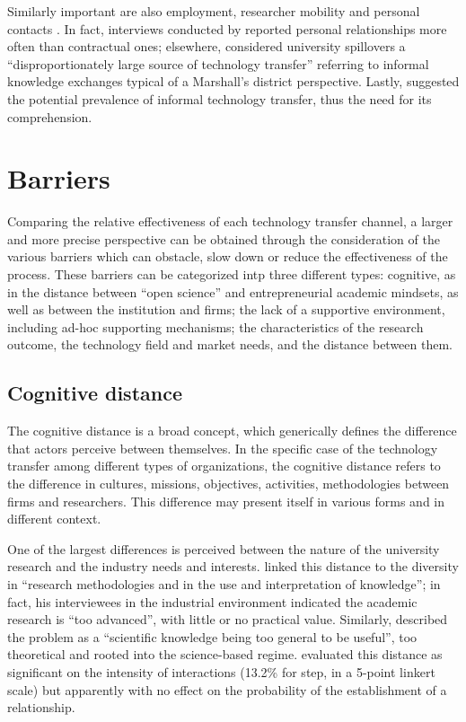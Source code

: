 Similarly important are also employment, researcher mobility and personal contacts \citep{Bekkers2008}. In fact, interviews conducted by \citet{Siegel2003a} reported personal relationships more often than contractual ones; elsewhere, \citet{Sohn2012} considered university spillovers a \enquote{disproportionately large source of technology transfer} referring to informal knowledge exchanges typical of a Marshall's district perspective. Lastly, \citet{Link2007} suggested the potential prevalence of informal technology transfer, thus the need for its comprehension. 

\section{Barriers} 

Comparing the relative effectiveness of each technology transfer channel, a larger and more precise perspective can be obtained through the consideration of the various barriers which can obstacle, slow down or reduce the effectiveness of the process. These barriers can be categorized intp three different types: cognitive, as in the distance between \enquote{open science} and entrepreneurial academic mindsets, as well as between the institution and firms; the lack of a supportive environment, including ad-hoc supporting mechanisms; the characteristics of the research outcome, the technology field and market needs, and the distance between them.

\subsection{Cognitive distance} 

The cognitive distance is a broad concept, which generically defines the difference that actors perceive between themselves. In the specific case of the technology transfer among different types of organizations, the cognitive distance refers to the difference in cultures, missions, objectives, activities, methodologies between firms and researchers. This difference may present itself in various forms and in different context.

One of the largest differences is perceived between the nature of the university research and the industry needs and interests. \citet{Muscio2008} linked this distance to the diversity in \enquote{research methodologies and in the use and interpretation of knowledge}; in fact, his interviewees in the industrial environment indicated the academic research is \enquote{too advanced}, with little or no practical value. Similarly, \citet{Gilsing2011} described the problem as a \enquote{scientific knowledge being too general to be useful}, too theoretical and rooted into the science-based regime. \citet{Muscio2013} evaluated this distance as significant on the intensity of interactions (13.2\% for step, in a 5-point linkert scale) but apparently with no effect on the probability of the establishment of a relationship.

